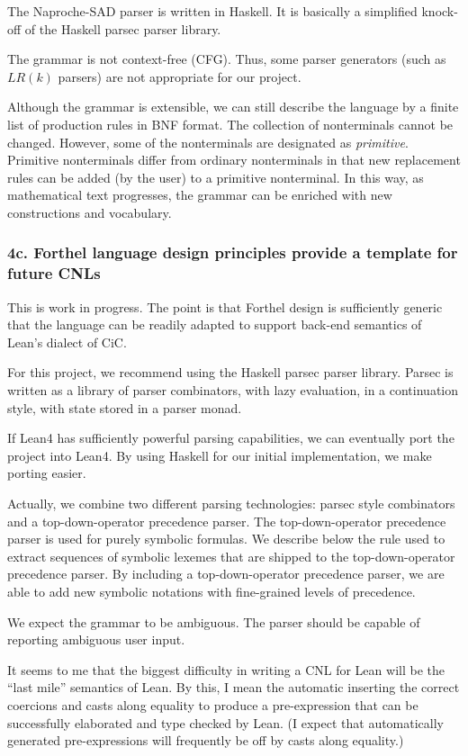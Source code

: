 \documentclass[12pt]{amsart}
\renewcommand{\~}{\ }
\renewcommand{\_}{\textunderscore}
\begin{document}
The Naproche-SAD parser is written in Haskell.  It is basically a
simplified knock-off of the Haskell parsec parser library.

The grammar is not context-free (CFG).  Thus, some parser generators
(such as $LR(k)$ parsers) are not appropriate for our project.

Although the grammar is extensible, we can still describe the language
by a finite list of production rules in BNF format.  The collection of
nonterminals cannot be changed.  However, some of the nonterminals are
designated as {\it primitive}.  Primitive nonterminals differ from
ordinary nonterminals in that new replacement rules can be added (by
the user) to a primitive nonterminal.  In this way, as mathematical
text progresses, the grammar can be enriched with new constructions
and vocabulary.


\subsubsection*{4c.  Forthel language design principles
  provide a template for future CNLs}

This is work in progress.  The point is that Forthel design is
sufficiently generic that the language can be readily adapted to
support back-end semantics of Lean's dialect of CiC.

For this project, we recommend using the Haskell parsec parser
library.  Parsec is written as a library of parser combinators, with
lazy evaluation, in a continuation style, with state stored in a
parser monad.

If Lean4 has sufficiently powerful parsing capabilities, we can
eventually port the project into Lean4.  By using Haskell for our
initial implementation, we make porting easier.


Actually, we combine two different parsing technologies: parsec style
combinators and a top-down-operator precedence parser.  The
top-down-operator precedence parser is used for purely symbolic
formulas.  We describe below the rule used to extract sequences of
symbolic lexemes that are shipped to the top-down-operator precedence
parser.  By including a top-down-operator precedence parser, we are
able to add new symbolic notations with fine-grained levels of
precedence.

We expect the grammar to be ambiguous.  The parser should be capable
of reporting ambiguous user input.

It seems to me that the biggest difficulty in writing a CNL for Lean
will be the ``last mile'' semantics of Lean.  By this, I mean the
automatic inserting the correct coercions and casts along equality to
produce a pre-expression that can be successfully elaborated and type
checked by Lean.  (I expect that automatically generated
pre-expressions will frequently be off by casts along equality.)
\end{document}
